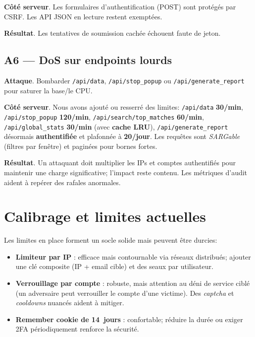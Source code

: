 \textbf{Côté serveur}. Les formulaires d'authentification (POST) sont protégés par CSRF. Les API JSON en lecture restent exemptées.

\textbf{Résultat}. Les tentatives de soumission cachée échouent faute de jeton.

\subsection*{A6 — DoS sur endpoints lourds}
\textbf{Attaque}. Bombarder \texttt{/api/data}, \texttt{/api/stop\_popup} ou \texttt{/api/generate\_report} pour saturer la base/le CPU.

\textbf{Côté serveur}. Nous avons ajouté ou resserré des limites: \texttt{/api/data} \textbf{30/min}, \texttt{/api/stop\_popup} \textbf{120/min}, \texttt{/api/search/top\_matches} \textbf{60/min}, \texttt{/api/global\_stats} \textbf{30/min} (avec \textbf{cache LRU}), \texttt{/api/generate\_report} désormais \textbf{authentifiée} et plafonnée à \textbf{20/jour}. Les requêtes sont \emph{SARGable} (filtres par fenêtre) et paginées pour bornes fortes.

\textbf{Résultat}. Un attaquant doit multiplier les IPs et comptes authentifiés pour maintenir une charge significative; l'impact reste contenu. Les métriques d'audit aident à repérer des rafales anormales.

\section{Calibrage et limites actuelles}
\noindent Les limites en place forment un socle solide mais peuvent être durcies:
\begin{itemize}
  \item \textbf{Limiteur par IP} : efficace mais contournable via réseaux distribués; ajouter une clé composite (IP + email cible) et des \og seaux \fg{} par utilisateur.
  \item \textbf{Verrouillage par compte} : robuste, mais attention au déni de service ciblé (un adversaire peut \og verrouiller \fg{} le compte d'une victime). Des \emph{captcha} et \emph{cooldowns} nuancés aident à mitiger.
  \item \textbf{Remember cookie de 14~jours} : confortable; réduire la durée ou exiger 2FA périodiquement renforce la sécurité.
\end{itemize}

